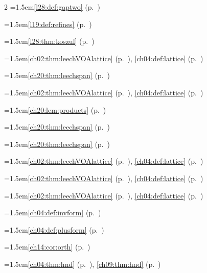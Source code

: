 \begin{multicols}{2}
\hangindent=1.5em\quad \ref{l28:def:gaptwo} (p.~\pageref{l28:def:gaptwo})\par
\hangindent=1.5em\quad \ref{l19:def:refines} (p.~\pageref{l19:def:refines})\par
\hangindent=1.5em\quad \ref{l28:thm:koszul} (p.~\pageref{l28:thm:koszul})\par
\hangindent=1.5em\quad \ref{ch02:thm:leechVOAlattice} (p.~\pageref{ch02:thm:leechVOAlattice}), \ref{ch04:def:lattice} (p.~\pageref{ch04:def:lattice})\par
\hangindent=1.5em\quad \ref{ch20:thm:leechspan} (p.~\pageref{ch20:thm:leechspan})\par
\hangindent=1.5em\quad \ref{ch02:thm:leechVOAlattice} (p.~\pageref{ch02:thm:leechVOAlattice}), \ref{ch04:def:lattice} (p.~\pageref{ch04:def:lattice})\par
\hangindent=1.5em\quad \ref{ch20:lem:products} (p.~\pageref{ch20:lem:products})\par
\hangindent=1.5em\quad \ref{ch20:thm:leechspan} (p.~\pageref{ch20:thm:leechspan})\par
\hangindent=1.5em\quad \ref{ch20:thm:leechspan} (p.~\pageref{ch20:thm:leechspan})\par
\hangindent=1.5em\quad \ref{ch02:thm:leechVOAlattice} (p.~\pageref{ch02:thm:leechVOAlattice}), \ref{ch04:def:lattice} (p.~\pageref{ch04:def:lattice})\par
\hangindent=1.5em\quad \ref{ch02:thm:leechVOAlattice} (p.~\pageref{ch02:thm:leechVOAlattice}), \ref{ch04:def:lattice} (p.~\pageref{ch04:def:lattice})\par
\hangindent=1.5em\quad \ref{ch02:thm:leechVOAlattice} (p.~\pageref{ch02:thm:leechVOAlattice}), \ref{ch04:def:lattice} (p.~\pageref{ch04:def:lattice})\par
\hangindent=1.5em\quad \ref{ch04:def:invform} (p.~\pageref{ch04:def:invform})\par
\hangindent=1.5em\quad \ref{ch04:def:plusform} (p.~\pageref{ch04:def:plusform})\par
\hangindent=1.5em\quad \ref{ch14:cor:orth} (p.~\pageref{ch14:cor:orth})\par
\hangindent=1.5em\quad \ref{ch04:thm:hnd} (p.~\pageref{ch04:thm:hnd}), \ref{ch09:thm:hnd} (p.~\pageref{ch09:thm:hnd})\par

\end{multicols}
